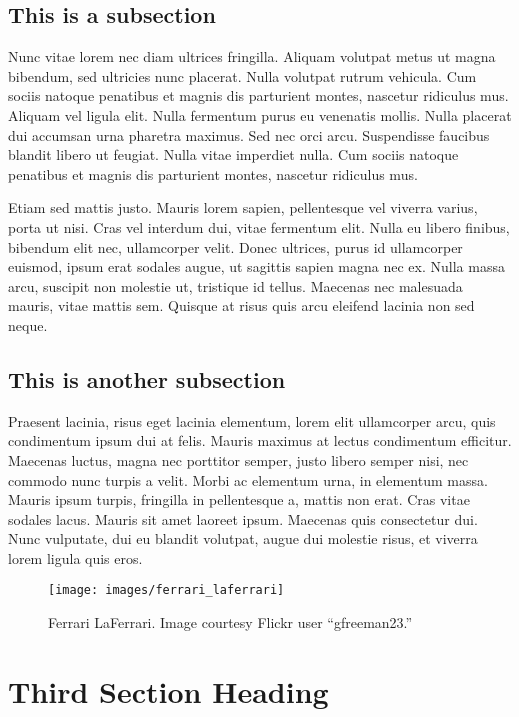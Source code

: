 \documentclass{acmsiggraph}
\begin{document}
\subsection{This is a subsection}

Nunc vitae lorem nec diam ultrices fringilla. Aliquam volutpat metus ut magna bibendum, sed ultricies nunc placerat. Nulla volutpat rutrum vehicula. Cum sociis natoque penatibus et magnis dis parturient montes, nascetur ridiculus mus. Aliquam vel ligula elit. Nulla fermentum purus eu venenatis mollis. Nulla placerat dui accumsan urna pharetra maximus. Sed nec orci arcu. Suspendisse faucibus blandit libero ut feugiat. Nulla vitae imperdiet nulla. Cum sociis natoque penatibus et magnis dis parturient montes, nascetur ridiculus mus.

Etiam sed mattis justo. Mauris lorem sapien, pellentesque vel viverra varius, porta ut nisi. Cras vel interdum dui, vitae fermentum elit. Nulla eu libero finibus, bibendum elit nec, ullamcorper velit. Donec ultrices, purus id ullamcorper euismod, ipsum erat sodales augue, ut sagittis sapien magna nec ex. Nulla massa arcu, suscipit non molestie ut, tristique id tellus. Maecenas nec malesuada mauris, vitae mattis sem. Quisque at risus quis arcu eleifend lacinia non sed neque.

\subsection{This is another subsection}

Praesent lacinia, risus eget lacinia elementum, lorem elit ullamcorper arcu, quis condimentum ipsum dui at felis. Mauris maximus at lectus condimentum efficitur. Maecenas luctus, magna nec porttitor semper, justo libero semper nisi, nec commodo nunc turpis a velit. Morbi ac elementum urna, in elementum massa. Mauris ipsum turpis, fringilla in pellentesque a, mattis non erat. Cras vitae sodales lacus. Mauris sit amet laoreet ipsum. Maecenas quis consectetur dui. Nunc vulputate, dui eu blandit volutpat, augue dui molestie risus, et viverra lorem ligula quis eros.

\begin{figure}[ht]
  \centering
  \texttt{[image: images/ferrari\_laferrari]}
  \caption{Ferrari LaFerrari. Image courtesy Flickr user ``gfreeman23.''}
  \label{fig:ferrari}
\end{figure}

\section{Third Section Heading}
\end{document}
